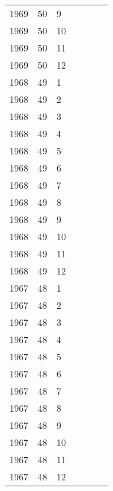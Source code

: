 \begin{longtable}{ |l|l|l|l|p{2.7cm}|l|p{2cm}| }
 1969 & 50 &     9 &         &                &  & \\
 1969 & 50 &    10 &         &                &  & \\
 1969 & 50 &    11 &         &                &  & \\
 1969 & 50 &    12 &         &                &  & \\
 1968 & 49 &     1 &         &                &  & \\
 1968 & 49 &     2 &         &                &  & \\
 1968 & 49 &     3 &         &                &  & \\
 1968 & 49 &     4 &         &                &  & \\
 1968 & 49 &     5 &         &                &  & \\
 1968 & 49 &     6 &         &                &  & \\
 1968 & 49 &     7 &         &                &  & \\
 1968 & 49 &     8 &         &                &  & \\
 1968 & 49 &     9 &         &                &  & \\
 1968 & 49 &    10 &         &                &  & \\
 1968 & 49 &    11 &         &                &  & \\
 1968 & 49 &    12 &         &                &  & \\
 1967 & 48 &     1 &         &                &  & \\
 1967 & 48 &     2 &         &                &  & \\
 1967 & 48 &     3 &         &                &  & \\
 1967 & 48 &     4 &         &                &  & \\
 1967 & 48 &     5 &         &                &  & \\
 1967 & 48 &     6 &         &                &  & \\
 1967 & 48 &     7 &         &                &  & \\
 1967 & 48 &     8 &         &                &  & \\
 1967 & 48 &     9 &         &                &  & \\
 1967 & 48 &    10 &         &                &  & \\
 1967 & 48 &    11 &         &                &  & \\
 1967 & 48 &    12 &         &                &  & \\

\end{longtable}
